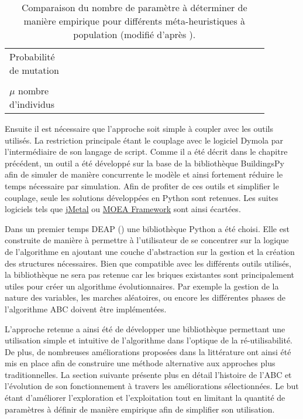 \begin{table}
\begin{tabular}{L{0.22\linewidth} L{0.22\linewidth} L{0.22\linewidth} L{0.22\linewidth}}
    \\
    Probabilité de mutation                  &                                            &                                 &                                                         \\
    \\
    $\mu$ nombre d’individus                 &                                            &                                 &                                                         \\
    \bottomrule
\end{tabular}
\caption{Comparaison du nombre de paramètre à déterminer de manière empirique pour différents
         méta-heuristiques à population (modifié d’après \cite{Armand-Decker2015}).
         \label{tab:meta_compare}}
\end{table}

Ensuite il est nécessaire que l’approche soit simple à coupler avec les outils
utilisés. La restriction principale étant le couplage avec le logiciel Dymola par
l’intermédiaire de son langage de script.
Comme il a été décrit dans le chapitre précédent, un outil a été développé sur la
base de la bibliothèque BuildingsPy afin de simuler de manière concurrente le modèle
et ainsi fortement réduire le temps nécessaire par simulation.
Afin de profiter de ces outils et simplifier le couplage, seule les solutions
développées en Python sont retenues. Les suites logiciels tels que
\href{http://jmetal.sourceforge.net/index.html}{jMetal} ou
\href{http://moeaframework.org/index.html}{MOEA Framework} sont ainsi écartées.

Dans un premier temps DEAP () une bibliothèque Python a été
choisi. Elle est construite de manière à permettre à l’utilisateur de se concentrer sur la
logique de l’algorithme en ajoutant une couche d’abstraction sur la gestion et la
création des structures nécessaires.
Bien que compatible avec les différents outils utilisés, la bibliothèque ne sera
pas retenue car les briques existantes sont principalement utiles pour créer un
algorithme évolutionnaires. Par exemple la gestion de la nature des variables,
les marches aléatoires, ou encore les différentes phases de l’algorithme ABC
doivent être implémentées.

L’approche retenue a ainsi été de développer une bibliothèque permettant une utilisation
simple et intuitive de l’algorithme dans l’optique de la ré-utilisabilité. De plus,
de nombreuses améliorations proposées dans la littérature ont ainsi été mis en place
afin de construire une méthode alternative aux approches plus traditionnelles.
La section suivante présente plus en détail l’histoire de l’ABC et l’évolution de
son fonctionnement à travers les améliorations sélectionnées.
Le but étant d’améliorer l’exploration et l’exploitation tout en limitant la quantité
de paramètres à définir de manière empirique afin de simplifier son utilisation.



